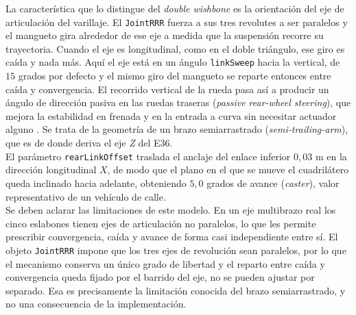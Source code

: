 
La característica que lo distingue del \textit{double wishbone} es la orientación del eje de articulación del varillaje. El \verb|JointRRR| fuerza a sus tres revolutes a ser paralelos y el mangueto gira alrededor de ese eje a medida que la suspensión recorre su trayectoria. Cuando el eje es longitudinal, como en el doble triángulo, ese giro es caída y nada más. Aquí el eje está en un ángulo \verb|linkSweep| hacia la vertical, de $15$ grados por defecto y el mismo giro del mangueto se reparte entonces entre caída y convergencia. El recorrido vertical de la rueda pasa así a producir un ángulo de dirección pasiva en las ruedas traseras (\textit{passive rear-wheel steering}), que mejora la estabilidad en frenada y en la entrada a curva sin necesitar actuador alguno \cite{milliken1995,reimpell2001}. Se trata de la geometría de un brazo semiarrastrado (\textit{semi-trailing-arm}), que es de donde deriva el eje \textit{Z} del E36. \\

El parámetro \verb|rearLinkOffset| traslada el anclaje del enlace inferior $0{,}03$ m en la dirección longitudinal $X$, de modo que el plano en el que se mueve el cuadrilátero queda inclinado hacia adelante, obteniendo $5{,}0$ grados de avance (\textit{caster}), valor representativo de un vehículo de calle.\\

Se deben aclarar las limitaciones de este modelo. En un eje multibrazo real los cinco eslabones tienen ejes de articulación no paralelos, lo que les permite prescribir convergencia, caída y avance de forma casi independiente entre sí. El objeto \verb|JointRRR| impone que los tres ejes de revolución sean paralelos, por lo que el mecanismo conserva un único grado de libertad y el reparto entre caída y convergencia queda fijado por el barrido del eje, no se pueden ajustar por separado. Esa es precisamente la limitación conocida del brazo semiarrastrado, y no una consecuencia de la implementación.\\




